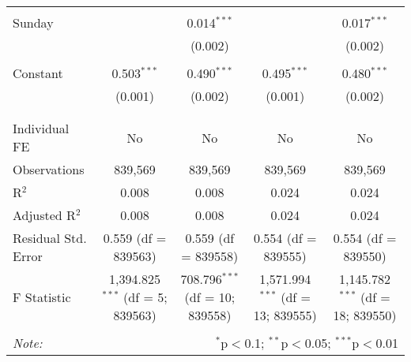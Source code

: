 \documentclass[
]{article}
\begin{document}
\begin{table}[!htbp]
{\begin{tabular}{@{\extracolsep{5pt}}lcccc}
  & & & & \\ 
 Sunday &  & 0.014$^{***}$ &  & 0.017$^{***}$ \\ 
  &  & (0.002) &  & (0.002) \\ 
  & & & & \\ 
 Constant & 0.503$^{***}$ & 0.490$^{***}$ & 0.495$^{***}$ & 0.480$^{***}$ \\ 
  & (0.001) & (0.002) & (0.001) & (0.002) \\ 
  & & & & \\ 
\hline \\[-1.8ex] 
Individual FE & No & No & No & No \\ 
Observations & 839,569 & 839,569 & 839,569 & 839,569 \\ 
R$^{2}$ & 0.008 & 0.008 & 0.024 & 0.024 \\ 
Adjusted R$^{2}$ & 0.008 & 0.008 & 0.024 & 0.024 \\ 
Residual Std. Error & 0.559 (df = 839563) & 0.559 (df = 839558) & 0.554 (df = 839555) & 0.554 (df = 839550) \\ 
F Statistic & 1,394.825$^{***}$ (df = 5; 839563) & 708.796$^{***}$ (df = 10; 839558) & 1,571.994$^{***}$ (df = 13; 839555) & 1,145.782$^{***}$ (df = 18; 839550) \\ 
\hline 
\hline \\[-1.8ex] 
\textit{Note:}  & \multicolumn{4}{r}{$^{*}$p$<$0.1; $^{**}$p$<$0.05; $^{***}$p$<$0.01} \\ 
\end{tabular}
} 
\end{table} 
\newpage
\end{document}
